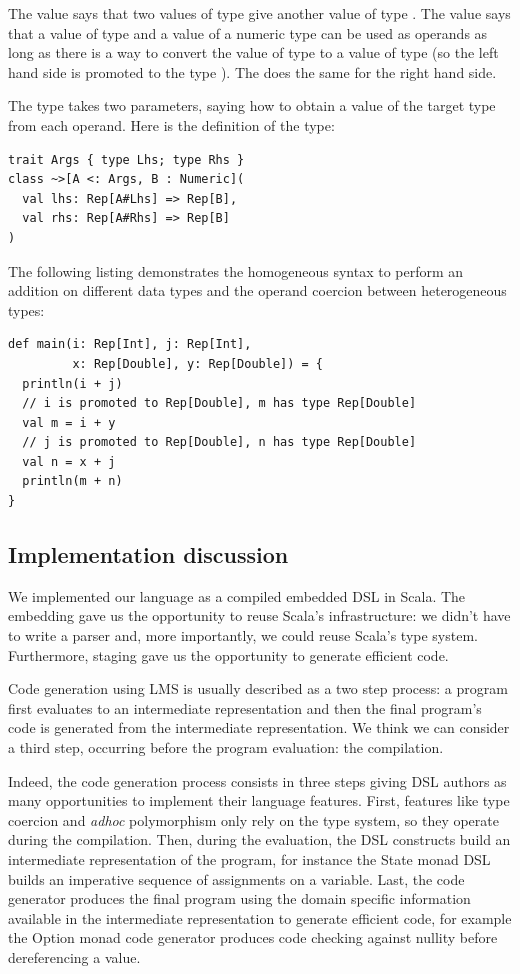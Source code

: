 \documentclass[american,english,runningheads]{llncs}
\begin{document}
The  value says that two values of type  give another value of type . The
 value says that a value of type  and a value of a numeric type  can be used as
operands as long as there is a way to convert the value of type  to a value of type  (so the left
hand side is promoted to the type ). The  does the same for the right hand side.

The \code{\~\>} type takes two parameters, saying how to obtain a value of the target type from each operand. Here is
the definition of the \code{\~\>} type:

\begin{lstlisting}
trait Args { type Lhs; type Rhs }
class ~>[A <: Args, B : Numeric](
  val lhs: Rep[A#Lhs] => Rep[B],
  val rhs: Rep[A#Rhs] => Rep[B]
)
\end{lstlisting}

The following listing demonstrates the homogeneous syntax to perform an addition on different data types and the
operand coercion between heterogeneous types:

\begin{lstlisting}
def main(i: Rep[Int], j: Rep[Int],
         x: Rep[Double], y: Rep[Double]) = {
  println(i + j)
  // i is promoted to Rep[Double], m has type Rep[Double]
  val m = i + y
  // j is promoted to Rep[Double], n has type Rep[Double]
  val n = x + j
  println(m + n)
}
\end{lstlisting}

\subsection{Implementation discussion}

We implemented our language as a compiled embedded DSL in Scala. The embedding gave us the opportunity to reuse
Scala’s infrastructure: we didn’t have to write a parser and, more importantly, we could reuse Scala’s type system.
Furthermore, staging gave us the opportunity to generate efficient code.

Code generation using LMS is usually described as a two step process: a program first evaluates to an intermediate
representation and then the final program’s code is generated from the intermediate representation. We think we can
consider a third step, occurring before the program evaluation: the compilation.

Indeed, the code generation process consists in three steps giving DSL authors as many opportunities to implement
their language features. First, features like type coercion and \emph{adhoc} polymorphism only rely on the type
system, so they operate during the compilation. Then, during the evaluation, the DSL constructs build an intermediate
representation of the program, for instance the State monad DSL builds an imperative sequence of assignments on a
variable. Last, the code generator produces the final program using the domain specific information available in the
intermediate representation to generate efficient code, for example the Option monad code generator produces code
checking against nullity before dereferencing a value.
\end{document}
